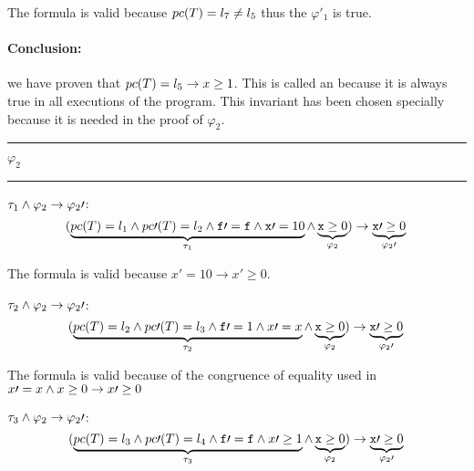 	The formula is valid because $pc(T) = l_7 \neq l_5$ thus the $\varphi\prime _1$ is true.


\paragraph{Conclusion:} we have proven that $pc(T) = l_5 \to x \geq 1$. 
%
This is called an  because it is always true in all executions of the program. 
%
This invariant has been chosen specially because it is needed in the proof of $\varphi_2$.

\begin{center}\rule{4cm}{0.4pt}  $\varphi_2$  \rule{4cm}{0.4pt}\end{center}

	\; $\tau_1 \wedge \varphi_2 \to \varphi_2\prime $:	
	\begin{equation*}
		(
			\underbrace{pc(T) = l_1 \wedge pc\prime (T) = l_2 \wedge \mathtt{f\prime =f} \wedge \mathtt{x}\prime  = 10}_{\tau_1} \wedge \underbrace{\mathtt{x} \geq 0}_{\varphi_2}
		) 
				\to  \underbrace{\mathtt{x}\prime  \geq 0}_{\varphi_2\prime }\\\\
	\end{equation*}


	The formula is valid because $x\prime =10 \to x\prime \geq 0$.

	\; $\tau_2 \wedge \varphi_2 \to \varphi_2\prime $:	
	\begin{equation*}
		(
			\underbrace{pc(T) = l_2 \wedge pc\prime (T) = l_3 \wedge \mathtt{f}\prime  = 1 \wedge x\prime =x}_{\tau_2} \wedge \underbrace{\mathtt{x} \geq 0}_{\varphi_2}
		) 
			\to \underbrace{\mathtt{x}\prime  \geq 0}_{\varphi_2\prime }\\\\
	\end{equation*}



	The formula is valid because of the congruence of equality used in  $x\prime =x \wedge x\geq 0 \to x\prime \geq 0$ 

	\; $\tau_3 \wedge \varphi_2 \to \varphi_2\prime $:
	\begin{equation*}
		(
			\underbrace{pc(T) = l_3 \wedge pc\prime (T) = l_4 \wedge \mathtt{f\prime =f} \wedge x\prime \geq 1}_{\tau_3} \wedge \underbrace{\mathtt{x} \geq 0}_{\varphi_2}
		) 
			\to \underbrace{\mathtt{x}\prime  \geq 0}_{\varphi_2\prime }\\\\
	\end{equation*}


